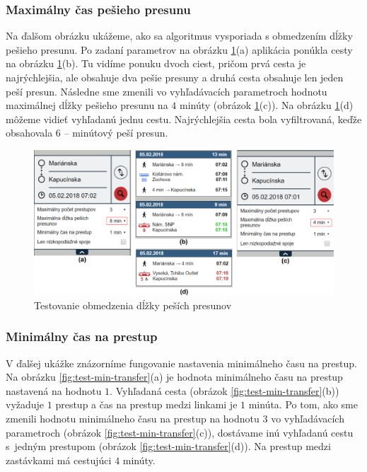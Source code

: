 \subsubsection{Maximálny čas pešieho presunu}
Na ďalšom obrázku ukážeme, ako sa algoritmus vysporiada s obmedzením dĺžky pešieho presunu. Po zadaní parametrov na obrázku \ref{fig:test-max-walking}(a) aplikácia ponúkla cesty na obrázku \ref{fig:test-max-walking}(b). Tu vidíme ponuku dvoch ciest, pričom prvá cesta je najrýchlejšia, ale obsahuje dva pešie presuny a druhá cesta obsahuje len jeden peší presun. 
Následne sme zmenili vo vyhľadávacích parametroch hodnotu maximálnej dĺžky pešieho presunu na $4$ minúty (obrázok \ref{fig:test-max-walking}(c)). Na obrázku \ref{fig:test-max-walking}(d) môžeme vidieť vyhľadanú jednu cestu. Najrýchlejšia cesta bola vyfiltrovaná, keďže obsahovala $6$ – minútový peší presun. 

\begin{figure}[H]
\centerline{\includegraphics[width=1.0\textwidth]{images/test/max-walking}}
\caption[Testovanie obmedzenia dĺžky peších presunov]{Testovanie obmedzenia dĺžky peších presunov}
\label{fig:test-max-walking}
\end{figure}


\subsubsection{Minimálny čas na prestup}
V ďalšej ukážke znázorníme fungovanie nastavenia minimálneho času na prestup. Na obrázku \ref{fig:test-min-transfer}(a) je hodnota minimálneho času na prestup nastavená na hodnotu $1$. Vyhľadaná cesta (obrázok \ref{fig:test-min-transfer}(b)) vyžaduje $1$ prestup a čas na prestup medzi linkami je $1$ minúta. Po tom, ako sme zmenili hodnotu minimálneho času na prestup na hodnotu $3$ vo vyhľadávacích parametroch (obrázok \ref{fig:test-min-transfer}(c)), dostávame inú vyhľadanú cestu s~jedným prestupom (obrázok \ref{fig:test-min-transfer}(d)). Na prestup medzi zastávkami má cestujúci $4$ minúty.

